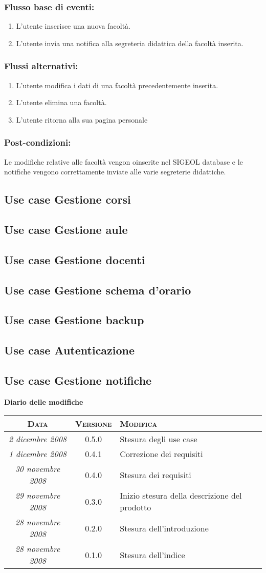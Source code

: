 \documentclass[11pt,a4paper]{article}
\newcommand{\modifiche} 
{
\newpage
\begin{center}
\textbf{Diario delle modifiche} \\
\bigskip
\begin{tabular}{|c|c|p{0.51\textwidth}|}
\hline
\textsc{Data} & \textsc{Versione} & \textsc{Modifica} \\
\hline
\hline
\textit{2 dicembre 2008} & 0.5.0 & Stesura degli use case \\
\hline
\textit{1 dicembre 2008} & 0.4.1 & Correzione dei requisiti \\
\hline
\textit{30 novembre 2008} & 0.4.0 & Stesura dei requisiti \\
\hline
\textit{29 novembre 2008} & 0.3.0 & Inizio stesura della descrizione del prodotto \\
\hline
\textit{28 novembre 2008} & 0.2.0 & Stesura dell'introduzione \\
\hline
\textit{28 novembre 2008} & 0.1.0 & Stesura dell'indice \\
\hline
\end{tabular}
\end{center}
}
\begin{document}
\subsubsection*{Flusso base di eventi:}
\begin{enumerate}
 \item L'utente inserisce una nuova facoltà.
 \item L'utente invia una notifica alla segreteria didattica della facoltà inserita.
\end{enumerate}

\subsubsection*{Flussi alternativi:}
\begin{enumerate}
 \item L'utente modifica i dati di una facoltà precedentemente inserita.
 \item L'utente elimina una facoltà.
 \item L'utente ritorna alla sua pagina personale
\end{enumerate}

\subsubsection*{Post-condizioni:}
Le modifiche relative alle facoltà vengon oinserite nel SIGEOL database e le notifiche vengono correttamente 
inviate alle varie segreterie didattiche.

\subsection{Use case Gestione corsi}
\subsection{Use case Gestione aule}
\subsection{Use case Gestione docenti}
\subsection{Use case Gestione schema d'orario}
\subsection{Use case Gestione backup}
\subsection{Use case Autenticazione}
\subsection{Use case Gestione notifiche}
\modifiche
\end{document}
